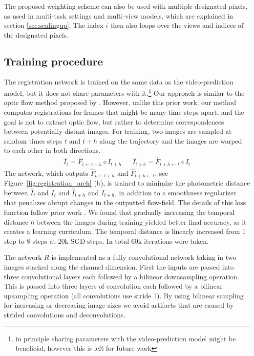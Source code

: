 The proposed weighting scheme can also be used with multiple designated pixels, as used in multi-task settings and multi-view models, which are explained in section \ref{sec:scalingup}. The index $i$ then also loops over the views and indices of the designated pixels.

\subsection{Training procedure}
\label{subsec:training}
The registration network is trained on the same data as the video-prediction model, but it does not share parameters with it.\footnote{in principle sharing parameters with the video-prediction model might be beneficial, however this is left for future work} Our approach is similar to the optic flow method proposed by \cite{meister2017unflow}. However, unlike this prior work, our method computes registrations for frames that might be many time steps apart, and the goal is not to extract optic flow, but rather to determine correspondences between potentially distant images. For training, two images are sampled at random times steps $t$ and $t+h$ along the trajectory and the images are warped to each other in both directions. 
\begin{align}
\hat{I}_{t} = \hat{F}_{t \leftarrow t +h} \diamond  I_{t+h} &&
\hat{I}_{t+h} = \hat{F}_{t+h \leftarrow t} \diamond  I_{t}
\end{align}
The network, which outputs $\hat{F}_{t \leftarrow t +h}$ and $\hat{F}_{t+h \leftarrow t}$, see Figure~\ref{fig:registration_arch} (b), is trained to minimize the photometric distance between $\hat{I}_t$ and $I_t$ and $\hat{I}_{t+h}$ and $I_{t+h}$, in addition to a smoothness regularizer that penalizes abrupt changes in the outputted flow-field. The details of this loss function follow prior work \cite{meister2017unflow}. We found that gradually increasing the temporal distance $h$ between the images during training yielded better final accuracy, as it creates a learning curriculum. The temporal distance is linearly increased from 1 step to 8 steps at 20k SGD steps. In total 60k iterations were taken.

The network $R$ is implemented as a fully convolutional network taking in two images stacked along the channel dimension. First the inputs are passed into three convolutional layers each followed by a bilinear downsampling operation. This is passed into three layers of convolution each followed by a bilinear upsampling operation (all convolutions use stride 1). By using bilinear sampling for increasing or decreasing image sizes we avoid artifacts that are caused by strided convolutions and deconvolutions.


